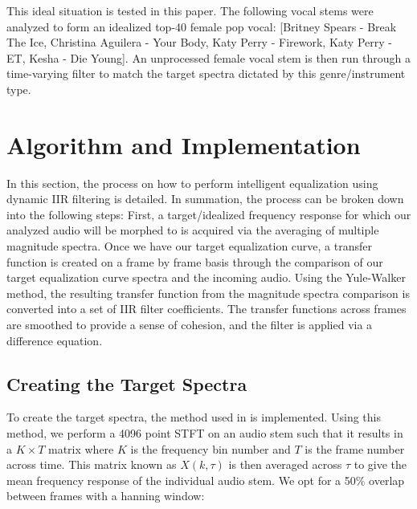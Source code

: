 \documentclass{article}
\begin{document}
This ideal situation is tested in this paper.  The following vocal stems were analyzed to form an idealized top-40 female pop vocal: [Britney Spears - Break The Ice, Christina Aguilera - Your Body, Katy Perry - Firework, Katy Perry - ET, Kesha - Die Young].  An unprocessed female vocal stem is then run through a time-varying filter to match the target spectra dictated by this genre/instrument type.

\section{Algorithm and Implementation}\label{sec:Algorithm and Implementation}

In this section, the process on how to perform intelligent equalization using dynamic IIR filtering is detailed.  In summation, the process can be broken down into the following steps: First, a target/idealized frequency response for which our analyzed audio will be morphed to is acquired via the averaging of multiple magnitude spectra.  Once we have our target equalization curve, a transfer function is created on a frame by frame basis through the comparison of our target equalization curve spectra and the incoming audio.  Using the Yule-Walker method, the resulting transfer function from the magnitude spectra comparison is converted into a set of IIR filter coefficients.  The transfer functions across frames are smoothed to provide a sense of cohesion, and the filter is applied via a difference equation.

\subsection{Creating the Target Spectra}
\label{subsec:Creating the Target Spectra}

To create the target spectra, the method used in \cite{pestana2013spectral} is implemented.  Using this method, we perform a 4096 point STFT on an audio stem such that it results in a $K \times T$ matrix where $K$ is the frequency bin number and $T$ is the frame number across time.  This matrix known as $X(k,\tau)$ is then averaged across $\tau$ to give the mean frequency response of the individual audio stem.  We opt for a 50\% overlap between frames with a hanning window:
\end{document}
